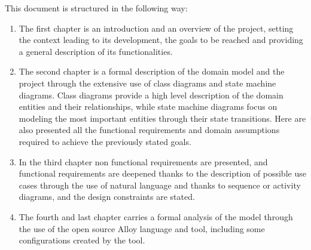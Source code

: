 \documentclass[../../main.tex]{subfiles}
\begin{document}
This document is structured in the following way:

\begin{enumerate}
    \item The first chapter is an introduction and an overview of the project, setting the context leading to its development, 
          the goals to be reached and providing a general description of its functionalities.

    \item The second chapter is a formal description of the domain model and the project through the extensive use of class diagrams and state machine diagrams. 
          Class diagrams provide a high level description of the domain entities and their relationships, while state machine diagrams focus on modeling the most important 
          entities through their state transitions. Here are also presented all the functional requirements and domain assumptions required to achieve the previously stated goals.

    \item In the third chapter non functional requirements are presented, and functional requirements are deepened thanks to the description of possible use cases through the use of natural language and thanks to sequence or activity diagrams, 
          and the design constraints are stated. 

    \item The fourth and last chapter carries a formal analysis of the model through the use of the open source Alloy language and tool, 
          including some configurations created by the tool.
\end{enumerate}
\end{document}
